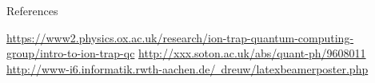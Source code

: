 \documentclass[final,hyperref={pdfpagelabels=false}]{beamer}
\begin{document}
\begin{frame}[t]
\begin{columns}[t]
\begin{column}{.465\textwidth}


\begin{block}{References}
        
\begin{thebibliography}{1}
\href{https://www2.physics.ox.ac.uk/research/ion-trap-quantum-computing-group/intro-to-ion-trap-qc}{https://www2.physics.ox.ac.uk/research/ion-trap-quantum-computing-group/intro-to-ion-trap-qc}
\href{http://xxx.soton.ac.uk/abs/quant-ph/9608011}{http://xxx.soton.ac.uk/abs/quant-ph/9608011}
\href{http://www-i6.informatik.rwth-aachen.de/~dreuw/latexbeamerposter.php}{http://www-i6.informatik.rwth-aachen.de/~dreuw/latexbeamerposter.php}
\end{thebibliography}


\end{block}









\end{column}
\end{columns}
\end{frame}
\end{document}
